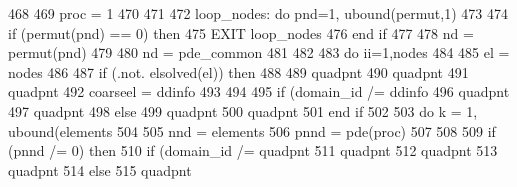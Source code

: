 \begin{DoxyCode}
468       
469       proc = 1
470       
471 
472       loop\_nodes: \textcolor{keywordflow}{do} pnd=1, ubound(permut,1)
473 
474                       \textcolor{keywordflow}{if} (permut(pnd) == 0) \textcolor{keywordflow}{then}
475                         \textcolor{keywordflow}{EXIT} loop\_nodes
476 \textcolor{keywordflow}{                      end if}
477 
478                       nd = permut(pnd)
479 
480                       nd = pde_common%
481 
482 
483                       \textcolor{keywordflow}{do} ii=1,nodes%
484 
485                         el = nodes%
486 
487                         \textcolor{keywordflow}{if} (.not. elsolved(el)) \textcolor{keywordflow}{then}
488 
489                           quadpnt%
490                           quadpnt%
491                           quadpnt%
492                           coarseel = ddinfo%
493         
494                           
495                           \textcolor{keywordflow}{if} (domain\_id /= ddinfo%
496                             quadpnt%
497                             quadpnt%
498 \textcolor{comment}{                          }\textcolor{keywordflow}{else}
499                             quadpnt%
500                             quadpnt%
501 \textcolor{keywordflow}{                          end if}
502 
503                           \textcolor{keywordflow}{do} k = 1, ubound(elements%
504                           
505                             nnd = elements%
506                             pnnd = pde(proc)%
507                             
508                            
509                             \textcolor{keywordflow}{if} (pnnd /= 0) \textcolor{keywordflow}{then} 
510                               \textcolor{keywordflow}{if} (domain\_id /= quadpnt%
511 \textcolor{comment}{                                quadpnt%
512 \textcolor{comment}{                                quadpnt%
513 \textcolor{comment}{                                quadpnt%
514 \textcolor{comment}{                              }\textcolor{keywordflow}{else}
515                                 quadpnt%
}}}
\end{DoxyCode}
